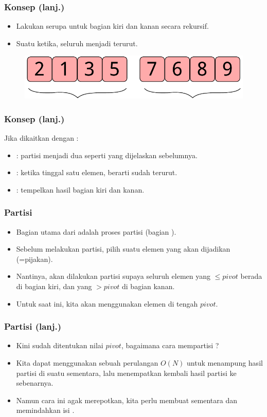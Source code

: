 \begin{frame}
\frametitle{Konsep (lanj.)}
\begin{itemize}
  \item Lakukan \fquickSort serupa untuk bagian kiri dan kanan secara rekursif.
  \item Suatu ketika, seluruh \farray menjadi terurut.
\end{itemize}
\begin{figure}
  \centering
  \includegraphics[width=7 cm]{asset/quicksort-concept-3.pdf}
\end{figure}
\end{frame}

\begin{frame}
\frametitle{Konsep (lanj.)}
Jika dikaitkan dengan \fdivideAndConquer:
\begin{itemize}
  \item {}: partisi \farray menjadi dua seperti yang dijelaskan sebelumnya.
  \item {}: ketika \farray tinggal satu elemen, berarti sudah terurut.
  \item {}: tempelkan hasil \fquickSort bagian kiri dan kanan.
\end{itemize}
\end{frame}

\begin{frame}
\frametitle{Partisi}
\begin{itemize}
  \item Bagian utama dari \fquickSort adalah proses partisi (bagian ).
  \item Sebelum melakukan partisi, pilih suatu elemen yang akan dijadikan \fpivot (=pijakan).
  \item Nantinya, akan dilakukan partisi supaya seluruh elemen yang $\leq pivot$ berada di bagian kiri, dan yang $> pivot$ di bagian kanan.
  \item Untuk saat ini, kita akan menggunakan elemen di tengah \farray $pivot$.
\end{itemize}
\end{frame}

\begin{frame}
\frametitle{Partisi (lanj.)}
\begin{itemize}
  \item Kini sudah ditentukan nilai $pivot$, bagaimana cara mempartisi \farray?
  \item Kita dapat menggunakan sebuah perulangan $O(N)$ untuk menampung hasil partisi di suatu \farray sementara, lalu menempatkan kembali hasil partisi ke \farray sebenarnya.
  \item Namun cara ini agak merepotkan, kita perlu membuat \farray sementara dan memindahkan isi \farray.
\end{itemize}
\end{frame}

